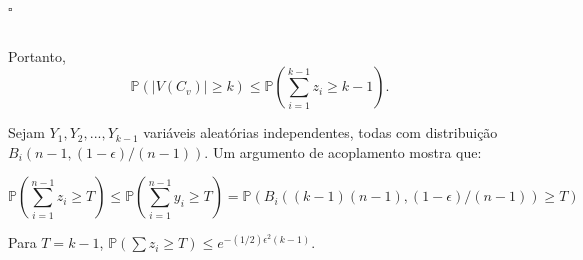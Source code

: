 \documentclass[a4paper,12pt]{article}
\begin{document}
\begin{flushright}
$\square$
\end{flushright}\\

Portanto,
 \[\mathbb{P}(|V(C_v)|\geq k)\leq \mathbb{P}(\sum_{i=1}^{k-1}z_i\geq k-1).  \]
 
 Sejam $Y_1,Y_2,...,Y_{k-1}$ variáveis aleatórias independentes, todas com distribuição $ B_i(n-1,(1-\epsilon)/(n-1))$. Um argumento de acoplamento mostra que:
 
 \[\mathbb{P}(\sum_{i=1}^{n-1}z_i\geq T)\leq\mathbb{P}(\sum_{i=1}^{n-1}y_i\geq T)=\mathbb{P}(B_i((k-1)(n-1),(1-\epsilon)/(n-1))\geq T) \]
 
 
 Para $T=k-1$, $\mathbb{P}(\sum z_i \geq T)\leq e^{-(1/2)\epsilon^2(k-1)}$.
\end{document}
